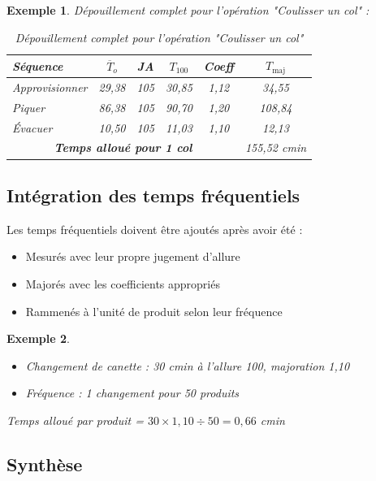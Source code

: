 \documentclass[a4paper,12pt]{article}
\newtheorem{exemple}{Exemple}[section]
\begin{document}
\begin{exemple}
Dépouillement complet pour l'opération "Coulisser un col" :

\begin{table}[ht]
\centering
\begin{tabular}{|l|c|c|c|c|c|}
\hline
\textbf{Séquence} & $\overline{T}_o$ & \textbf{JA} & $T_{100}$ & \textbf{Coeff} & $T_{\text{maj}}$ \\
\hline
Approvisionner & 29,38 & 105 & 30,85 & 1,12 & 34,55 \\
Piquer & 86,38 & 105 & 90,70 & 1,20 & 108,84 \\
Évacuer & 10,50 & 105 & 11,03 & 1,10 & 12,13 \\
\hline
\multicolumn{5}{|c|}{\textbf{Temps alloué pour 1 col}} & 155,52 cmin \\
\hline
\end{tabular}
\caption{Dépouillement complet pour l'opération "Coulisser un col"}
\end{table}
\end{exemple}

\subsection{Intégration des temps fréquentiels}

Les temps fréquentiels doivent être ajoutés après avoir été :
\begin{itemize}
    \item Mesurés avec leur propre jugement d'allure
    \item Majorés avec les coefficients appropriés
    \item Rammenés à l'unité de produit selon leur fréquence
\end{itemize}

\begin{exemple}
\begin{itemize}
    \item Changement de canette : 30 cmin à l'allure 100, majoration 1,10
    \item Fréquence : 1 changement pour 50 produits
\end{itemize}

Temps alloué par produit = $30 \times 1,10 \div 50 = 0,66$ cmin
\end{exemple}

\subsection{Synthèse}
\end{document}
